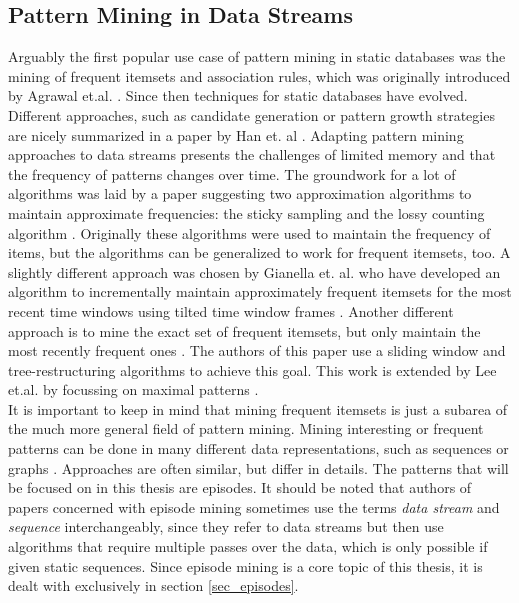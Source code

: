 \subsection{Pattern Mining in Data Streams}
\label{subsec_PatternMining}
Arguably the first popular use case of pattern mining in static databases was the mining of frequent itemsets and association rules, which was originally introduced by Agrawal et.al. \cite{agrawal1993mining}. Since then techniques for static databases have evolved. Different approaches, such as candidate generation or pattern growth strategies are nicely summarized in a paper by Han et. al \cite{han2007frequent}. Adapting pattern mining approaches to data streams presents the challenges of limited memory and that the frequency of patterns changes over time. The groundwork for a lot of algorithms was laid by a paper suggesting two approximation algorithms to maintain approximate frequencies: the sticky sampling and the lossy counting algorithm \cite{manku2002approximate}. Originally these algorithms were used to maintain the frequency of items, but the algorithms can be generalized to work for frequent itemsets, too. A slightly different approach was chosen by Gianella et. al. who have developed an algorithm to incrementally maintain approximately frequent itemsets for the most recent time windows using tilted time window frames \cite{giannella2003mining}. Another different approach is to mine the exact set of frequent itemsets, but only maintain the most recently frequent ones \citep{tanbeer2009sliding}. The authors of this paper use a sliding window and tree-restructuring algorithms to achieve this goal. This work is extended by Lee et.al. by focussing on maximal patterns \cite{lee2014sliding}. \\
It is important to keep in mind that mining frequent itemsets is just a subarea of the much more general field of pattern mining. Mining interesting or frequent patterns can be done in many different data representations, such as sequences \cite{mendes2008stream} or graphs \cite{bifet2011mining}. Approaches are often similar, but differ in details. The patterns that will be focused on in this thesis are episodes. It should be noted that authors of papers concerned with episode mining sometimes use the terms \textit{data stream} and \textit{sequence} interchangeably, since they refer to data streams but then use algorithms that require multiple passes over the data, which is only possible if given static sequences. Since episode mining is a core topic of this thesis, it is dealt with exclusively in section \ref{sec_episodes}.

